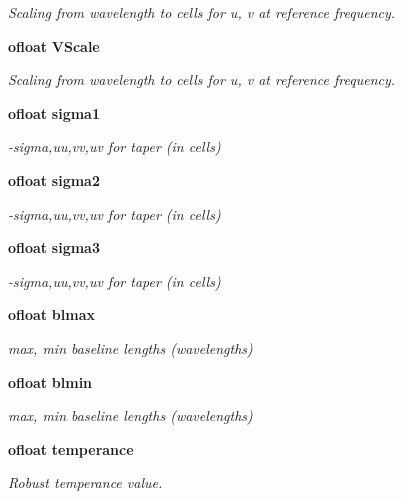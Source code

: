 \begin{CompactItemize}
\begin{CompactList}\small\item\em Scaling from wavelength to cells for u, v at reference frequency. \item\end{CompactList}\item 
{\bf ofloat} {\bf VScale}
\begin{CompactList}\small\item\em Scaling from wavelength to cells for u, v at reference frequency. \item\end{CompactList}\item 
{\bf ofloat} {\bf sigma1}
\begin{CompactList}\small\item\em -sigma,uu,vv,uv for taper (in cells) \item\end{CompactList}\item 
{\bf ofloat} {\bf sigma2}
\begin{CompactList}\small\item\em -sigma,uu,vv,uv for taper (in cells) \item\end{CompactList}\item 
{\bf ofloat} {\bf sigma3}
\begin{CompactList}\small\item\em -sigma,uu,vv,uv for taper (in cells) \item\end{CompactList}\item 
{\bf ofloat} {\bf blmax}
\begin{CompactList}\small\item\em max, min baseline lengths (wavelengths) \item\end{CompactList}\item 
{\bf ofloat} {\bf blmin}
\begin{CompactList}\small\item\em max, min baseline lengths (wavelengths) \item\end{CompactList}\item 
{\bf ofloat} {\bf temperance}
\begin{CompactList}\small\item\em Robust temperance value. \item\end{CompactList}\item 

\end{CompactItemize}

